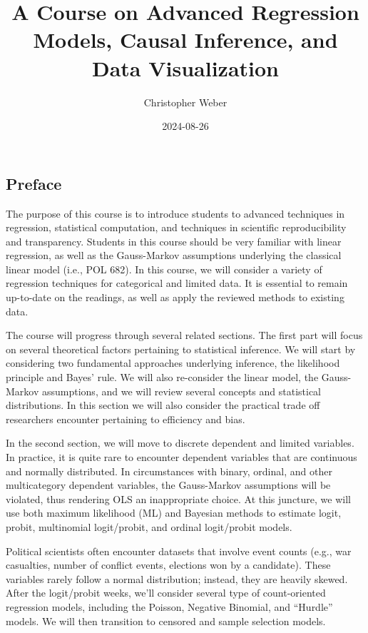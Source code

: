 \documentclass[
]{book}
\title{A Course on Advanced Regression Models, Causal Inference, and Data Visualization}
\author{Christopher Weber}
\date{2024-08-26}
\begin{document}
\maketitle

{
\setcounter{tocdepth}{1}
\tableofcontents
}
\chapter*{}\label{section}

\section*{Preface}\label{preface}

The purpose of this course is to introduce students to advanced techniques in regression, statistical computation, and techniques in scientific reproducibility and transparency. Students in this course should be very familiar with linear regression, as well as the Gauss-Markov assumptions underlying the classical linear model (i.e., POL 682). In this course, we will consider a variety of regression techniques for categorical and limited data. It is essential to remain up-to-date on the readings, as well as apply the reviewed methods to existing data.

The course will progress through several related sections. The first part will focus on several theoretical factors pertaining to statistical inference. We will start by considering two fundamental approaches underlying inference, the likelihood principle and Bayes' rule. We will also re-consider the linear model, the Gauss-Markov assumptions, and we will review several concepts and statistical distributions. In this section we will also consider the practical trade off researchers encounter pertaining to efficiency and bias.

In the second section, we will move to discrete dependent and limited variables. In practice, it is quite rare to encounter dependent variables that are continuous and normally distributed. In circumstances with binary, ordinal, and other multicategory dependent variables, the Gauss-Markov assumptions will be violated, thus rendering OLS an inappropriate choice. At this juncture, we will use both maximum likelihood (ML) and Bayesian methods to estimate logit, probit, multinomial logit/probit, and ordinal logit/probit models.

Political scientists often encounter datasets that involve event counts (e.g., war casualties, number of conflict events, elections won by a candidate). These variables rarely follow a normal distribution; instead, they are heavily skewed. After the logit/probit weeks, we'll consider several type of count-oriented regression models, including the Poisson, Negative Binomial, and ``Hurdle'' models. We will then transition to censored and sample selection models.
\end{document}
